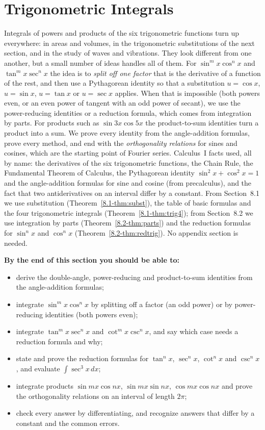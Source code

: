 \documentclass[11pt]{article}
\begin{document}
\section{Trigonometric Integrals}

\begin{guide}
Integrals of powers and products of the six trigonometric functions turn up everywhere: in areas and volumes, in the trigonometric substitutions of the next section, and in the study of waves and vibrations. They look different from one another, but a small number of ideas handles all of them. For $\sin^mx\cos^nx$ and $\tan^mx\sec^nx$ the idea is to \emph{split off one factor} that is the derivative of a function of the rest, and then use a Pythagorean identity so that a substitution $u=\cos x$, $u=\sin x$, $u=\tan x$ or $u=\sec x$ applies. When that is impossible (both powers even, or an even power of tangent with an odd power of secant), we use the power-reducing identities or a reduction formula, which comes from integration by parts. For products such as $\sin3x\cos5x$ the product-to-sum identities turn a product into a sum. We prove every identity from the angle-addition formulas, prove every method, and end with the \emph{orthogonality relations} for sines and cosines, which are the starting point of Fourier series. Calculus~I facts used, all by name: the derivatives of the six trigonometric functions, the Chain Rule, the Fundamental Theorem of Calculus, the Pythagorean identity $\sin^2x+\cos^2x=1$ and the angle-addition formulas for sine and cosine (from precalculus), and the fact that two antiderivatives on an interval differ by a constant. From Section~8.1 we use substitution (Theorem~\ref{8.1-thm:subst}), the table of basic formulas and the four trigonometric integrals (Theorem~\ref{8.1-thm:trig4}); from Section~8.2 we use integration by parts (Theorem~\ref{8.2-thm:parts}) and the reduction formulas for $\sin^nx$ and $\cos^nx$ (Theorem~\ref{8.2-thm:redtrig}). No appendix section is needed.
\end{guide}

\textbf{By the end of this section you should be able to:}
\begin{itemize}
  \item derive the double-angle, power-reducing and product-to-sum identities from the angle-addition formulas;
  \item integrate $\sin^mx\cos^nx$ by splitting off a factor (an odd power) or by power-reducing identities (both powers even);
  \item integrate $\tan^mx\sec^nx$ and $\cot^mx\csc^nx$, and say which case needs a reduction formula and why;
  \item state and prove the reduction formulas for $\tan^nx$, $\sec^nx$, $\cot^nx$ and $\csc^nx$, and evaluate $\int\sec^3x\,dx$;
  \item integrate products $\sin mx\cos nx$, $\sin mx\sin nx$, $\cos mx\cos nx$ and prove the orthogonality relations on an interval of length $2\pi$;
  \item check every answer by differentiating, and recognize answers that differ by a constant and the common errors.
\end{itemize}
\end{document}
